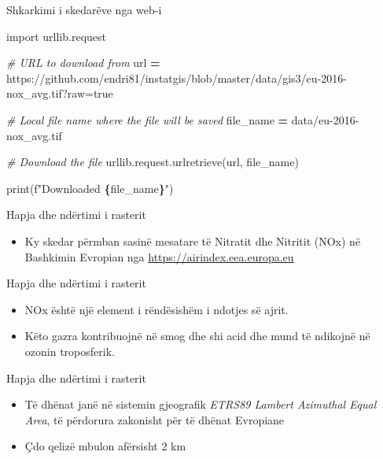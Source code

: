 \documentclass[
  ignorenonframetext,
]{beamer}
\newenvironment{Shaded}{\begin{snugshade}}{\end{snugshade}}
\newcommand{\BuiltInTok}[1]{#1}
\newcommand{\CommentTok}[1]{\textcolor[rgb]{0.56,0.35,0.01}{\textit{#1}}}
\newcommand{\ImportTok}[1]{#1}
\newcommand{\NormalTok}[1]{#1}
\newcommand{\OperatorTok}[1]{\textcolor[rgb]{0.81,0.36,0.00}{\textbf{#1}}}
\newcommand{\SpecialCharTok}[1]{\textcolor[rgb]{0.81,0.36,0.00}{\textbf{#1}}}
\newcommand{\SpecialStringTok}[1]{\textcolor[rgb]{0.31,0.60,0.02}{#1}}
\newcommand{\StringTok}[1]{\textcolor[rgb]{0.31,0.60,0.02}{#1}}
\providecommand{\tightlist}{%
  \setlength{\itemsep}{0pt}\setlength{\parskip}{0pt}}
\begin{document}
\begin{frame}[fragile]{Shkarkimi i skedarëve nga web-i}
\protect\hypertarget{shkarkimi-i-skedaruxebve-nga-web-i-3}{}

\begin{Shaded}
\begin{Highlighting}[]
\ImportTok{import}\NormalTok{ urllib.request}

\CommentTok{\# URL to download from}
\NormalTok{url }\OperatorTok{=} \StringTok{\textquotesingle{}https://github.com/endri81/instatgis/blob/master/data/gis3/eu{-}2016{-}nox\_avg.tif?raw=true\textquotesingle{}}

\CommentTok{\# Local file name where the file will be saved}
\NormalTok{file\_name }\OperatorTok{=} \StringTok{\textquotesingle{}data/eu{-}2016{-}nox\_avg.tif\textquotesingle{}}

\CommentTok{\# Download the file}
\NormalTok{urllib.request.urlretrieve(url, file\_name)}

\BuiltInTok{print}\NormalTok{(}\SpecialStringTok{f"Downloaded }\SpecialCharTok{\{}\NormalTok{file\_name}\SpecialCharTok{\}}\SpecialStringTok{"}\NormalTok{)}
\end{Highlighting}
\end{Shaded}
\end{frame}

\begin{frame}{Hapja dhe ndërtimi i rasterit}
\protect\hypertarget{hapja-dhe-nduxebrtimi-i-rasterit}{}
\begin{itemize}
\tightlist
\item
  Ky skedar përmban sasinë mesatare të Nitratit dhe Nitritit (NOx) në
  Bashkimin Evropian nga \url{https://airindex.eea.europa.eu}
\end{itemize}
\end{frame}

\begin{frame}{Hapja dhe ndërtimi i rasterit}
\protect\hypertarget{hapja-dhe-nduxebrtimi-i-rasterit-1}{}
\begin{itemize}
\item
  NOx është një element i rëndësishëm i ndotjes së ajrit.
\item
  Këto gazra kontribuojnë në smog dhe shi acid dhe mund të ndikojnë në
  ozonin troposferik.
\end{itemize}
\end{frame}

\begin{frame}{Hapja dhe ndërtimi i rasterit}
\protect\hypertarget{hapja-dhe-nduxebrtimi-i-rasterit-2}{}
\begin{itemize}
\item
  Të dhënat janë në sistemin gjeografik \emph{ETRS89 Lambert Azimuthal
  Equal Area}, të përdorura zakonisht për të dhënat Evropiane
\item
  Çdo qelizë mbulon afërsisht 2 km
\end{itemize}
\end{frame}
\end{document}
